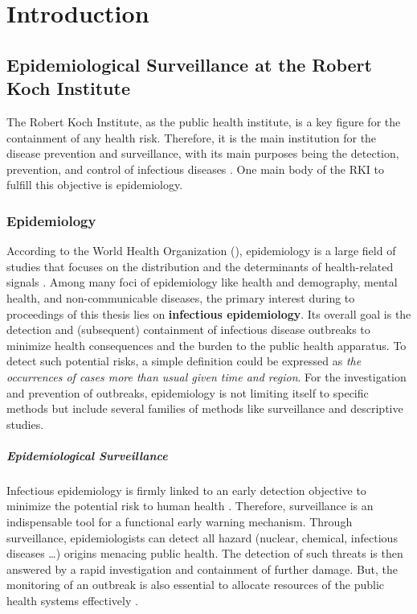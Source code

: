 \chapter{Introduction}

\section{Epidemiological Surveillance at the Robert Koch Institute}
The Robert Koch Institute, as the public health institute, is a key figure for the containment of any health risk.
Therefore, it is the main institution for the disease prevention and surveillance, with its main purposes being the detection, prevention, and control of infectious diseases \citep{rki_definition}. One main body of the RKI to fulfill this objective is epidemiology.

\subsection{Epidemiology}
According to the World Health Organization (), epidemiology is a large field of studies that focuses on the distribution and the determinants of health-related signals \citep{WHOepi}.
Among many foci of epidemiology like health and demography, mental health, and non-communicable diseases, the primary interest during to proceedings of this thesis lies on \textbf{infectious epidemiology}.
Its overall goal is the detection and (subsequent) containment of infectious disease outbreaks to minimize health consequences and the burden to the public health apparatus.
To detect such potential risks, a simple definition could be expressed as \textit{the occurrences of cases more than usual given time and region}.
For the investigation and prevention of outbreaks, epidemiology is not limiting itself to specific methods but include several families of methods like surveillance and descriptive studies.

\paragraph{Epidemiological Surveillance}
Infectious epidemiology is firmly linked to an early detection objective to minimize the potential risk to human health \citep{EarlyDetection}.
Therefore, surveillance is an indispensable tool for a functional early warning mechanism.
Through surveillance, epidemiologists can detect all hazard (nuclear, chemical, infectious diseases \ldots) origins menacing public health.
The detection of such threats is then answered by a rapid investigation and containment of further damage.
But, the monitoring of an outbreak is also essential to allocate resources of the public health systems effectively \citep{EarlyDetection}.

